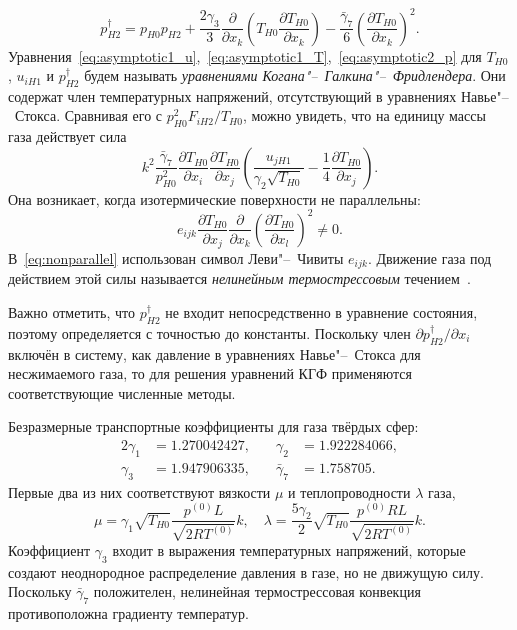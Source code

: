 \documentclass[
aps,%
12pt,%
final,%
notitlepage,%
oneside,%
onecolumn,%
nobibnotes,%
nofootinbib,%
superscriptaddress,%
noshowpacs,%
showkeys,%
floatfix,%
tightenlines,%
centertags]%
{revtex4}
\newcommand{\pder}[2][]{\frac{\partial#1}{\partial#2}}
\begin{document}
\begin{equation}\label{eq:dag_pressure}
    p_{H2}^\dag = p_{H0} p_{H2}
        + \frac{2\gamma_3}{3}\pder{x_k}\left(T_{H0}\pder[T_{H0}]{x_k}\right)
        - \frac{\bar{\gamma}_7}{6}\left(\pder[T_{H0}]{x_k}\right)^2.
\end{equation}
Уравнения~\eqref{eq:asymptotic1_u},~\eqref{eq:asymptotic1_T},~\eqref{eq:asymptotic2_p}
для \(T_{H0}\), \(u_{iH1}\) и \(p_{H2}^\dag\) будем называть \emph{уравнениями Когана"--~Галкина"--~Фридлендера}.
Они содержат член температурных напряжений, отсутствующий в уравнениях Навье"--~Стокса.
Сравнивая его с \(p_{H0}^2F_{iH2}/T_{H0}\), можно увидеть, что на единицу массы газа действует сила
\begin{equation}\label{eq:gamma7_force}
    k^2\frac{\bar{\gamma}_7}{p_{H0}^2}\pder[T_{H0}]{x_i}\pder[T_{H0}]{x_j}\left(\frac{u_{jH1}}{\gamma_2\sqrt{T_{H0}}} - \frac{1}4\pder[T_{H0}]{x_j}\right).
\end{equation}
Она возникает, когда изотермические поверхности не параллельны:
\begin{equation}\label{eq:nonparallel}
    e_{ijk}\pder[T_{H0}]{x_j}\pder{x_k}\left(\pder[T_{H0}]{x_l}\right)^2 \ne 0.
\end{equation}
В~\eqref{eq:nonparallel} использован символ Леви"--~Чивиты \(e_{ijk}\).
Движение газа под действием этой силы называется \emph{нелинейным термострессовым} течением~\cite{Sone2002,Sone2007}.

Важно отметить, что \(p_{H2}^\dag\) не входит непосредственно в уравнение состояния,
поэтому определяется с точностью до константы.
Поскольку член \(\partial{p_{H2}^\dag}/\partial{x_i}\) включён в систему,
как давление в уравнениях Навье"--~Стокса для несжимаемого газа,
то для решения уравнений КГФ применяются соответствующие численные методы.

Безразмерные транспортные коэффициенты для газа твёрдых сфер:
\begin{alignat*}{2}\label{eq:gamma_coeffs}
    \gamma_1 &= 1.270042427, &\quad \gamma_2 &= 1.922284066, \\
    \gamma_3 &= 1.947906335, &\quad \bar{\gamma}_7 &= 1.758705.
\end{alignat*}
Первые два из них соответствуют вязкости \(\mu\) и теплопроводности \(\lambda\) газа,
\begin{equation}\label{eq:mu_lambda}
    \mu = \gamma_1\sqrt{T_{H0}} \frac{p^{(0)}L}{\sqrt{2RT^{(0)}}} k, \quad
    \lambda = \frac{5\gamma_2}{2}\sqrt{T_{H0}} \frac{p^{(0)}RL}{\sqrt{2RT^{(0)}}} k.
\end{equation}
Коэффициент \(\gamma_3\) входит в выражения температурных напряжений,
которые создают неоднородное распределение давления в газе,
но не движущую силу. Поскольку \(\bar{\gamma}_7\) положителен,
нелинейная термострессовая конвекция противоположна градиенту температур.
\end{document}
